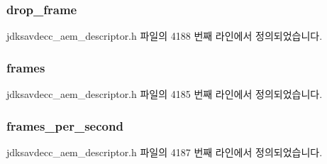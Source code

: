 \subsubsection[{\texorpdfstring{drop\+\_\+frame}{drop_frame}}]{ drop\+\_\+frame}\hypertarget{structjdksavdecc__values__smpte__time_a9007da8de1dceae90e4e7b85f540333c}{}\label{structjdksavdecc__values__smpte__time_a9007da8de1dceae90e4e7b85f540333c}


jdksavdecc\+\_\+aem\+\_\+descriptor.\+h 파일의 4188 번째 라인에서 정의되었습니다.

\subsubsection[{\texorpdfstring{frames}{frames}}]{ frames}\hypertarget{structjdksavdecc__values__smpte__time_ae45acaaf86f2d2177e4daa08f28ded47}{}\label{structjdksavdecc__values__smpte__time_ae45acaaf86f2d2177e4daa08f28ded47}


jdksavdecc\+\_\+aem\+\_\+descriptor.\+h 파일의 4185 번째 라인에서 정의되었습니다.

\subsubsection[{\texorpdfstring{frames\+\_\+per\+\_\+second}{frames_per_second}}]{ frames\+\_\+per\+\_\+second}\hypertarget{structjdksavdecc__values__smpte__time_a216a45b8a2d7b6aede4316aad0142121}{}\label{structjdksavdecc__values__smpte__time_a216a45b8a2d7b6aede4316aad0142121}


jdksavdecc\+\_\+aem\+\_\+descriptor.\+h 파일의 4187 번째 라인에서 정의되었습니다.

